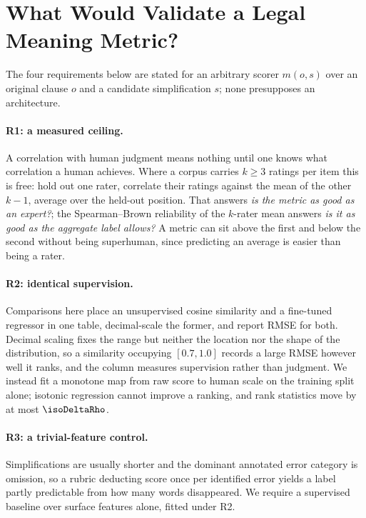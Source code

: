 \documentclass[11pt]{article}
\begin{document}
\section{What Would Validate a Legal Meaning Metric?}
\label{sec:protocol}

The four requirements below are stated for an arbitrary scorer $m(o,s)$ over an
original clause $o$ and a candidate simplification $s$; none presupposes an
architecture.

\paragraph{R1: a measured ceiling.}
A correlation with human judgment means nothing until one knows what correlation
a human achieves. Where a corpus carries $k \geq 3$ ratings per item this is
free: hold out one rater, correlate their ratings against the mean of the other
$k-1$, average over the held-out position. That answers \emph{is the metric as
good as an expert?}; the Spearman--Brown reliability of the $k$-rater mean
answers \emph{is it as good as the aggregate label allows?} A metric can sit
above the first and below the second without being superhuman, since predicting
an average is easier than being a rater.

\paragraph{R2: identical supervision.}
Comparisons here place an unsupervised cosine similarity and a fine-tuned
regressor in one table, decimal-scale the former, and report RMSE for both.
Decimal scaling fixes the range but neither the location nor the shape of the
distribution, so a similarity occupying $[0.7,1.0]$ records a large RMSE however
well it ranks, and the column measures supervision rather than judgment.
We instead fit a monotone map from raw score to human scale on the training
split alone; isotonic regression cannot improve a ranking, and rank statistics
move by at most $\isoDeltaRho$.

\paragraph{R3: a trivial-feature control.}
Simplifications are usually shorter and the dominant annotated error category is
omission, so a rubric deducting score once per identified error yields a label
partly predictable from how many words disappeared. We require a supervised
baseline over surface features alone, fitted under R2.
\end{document}
